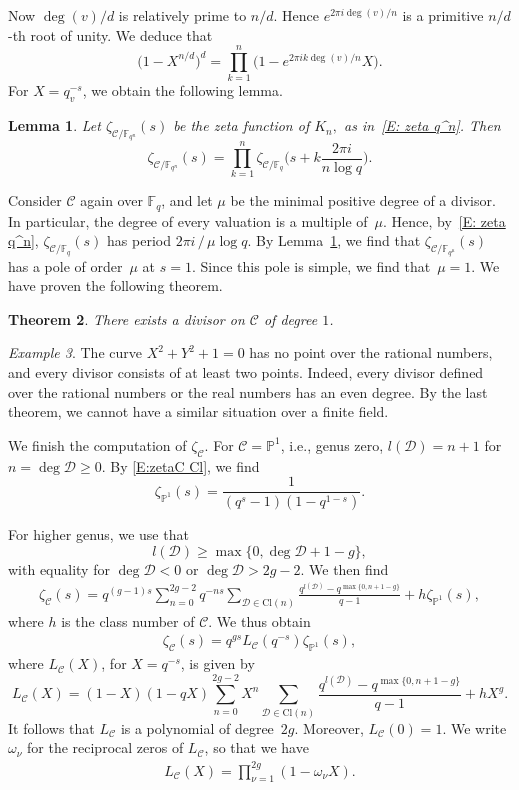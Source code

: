 \documentclass{amsart}
\renewcommand\P{\mathbb{P}}
\newcommand\F{\mathbb{F}}
\newcommand\Curve{\mathcal{C}}
\newcommand\calD{\mathcal{D}}	\newcommand\calK{\mathcal{K}}
\newcommand\Pic{\mathrm{Cl}}
\newtheorem{theorem}{Theorem}[section]
\newtheorem{lemma}[theorem]{Lemma}
\theoremstyle{definition}\newtheorem{definition}[theorem]{Definition}
\theoremstyle{remark}\newtheorem{remark}[theorem]{Remark}
\newtheorem{example}[theorem]{Example}\newtheorem{exercise}[theorem]{Exercise}
\numberwithin{equation}{section}
\begin{document}
Now $\deg(v)/d$ is relatively prime to $n/d$.
Hence $e^{2\pi i\deg(v)/n}$ is a primitive $n/d$-th root of unity.
We deduce that
$$
\bigl(1-X^{n/d}\bigr)^d=\prod_{k=1}^n\bigl(1-e^{2\pi ik\deg (v)/n}X\bigr).
$$
For $X=q_v^{-s}$,
we obtain the following lemma.

\begin{lemma}\label{L: zeta q^n}
Let\/ $\zeta_{\Curve/\F_{q^n}}(s)$ be the zeta function of\/ $K_n,$
as in~\eqref{E: zeta q^n}.
Then
$$
\zeta_{\Curve/\F_{q^n}}(s)=\prod_{k=1}^n\zeta_{\Curve/\F_q}\biggl(s+k\frac{2\pi i}{n\log q}\biggr).
$$
\end{lemma}

Consider $\Curve$ again over $\F_q$,
and let $\mu$ be the minimal positive degree of a divisor.
In particular,
the degree of every valuation is a multiple of~$\mu$.
Hence,
by~\eqref{E: zeta q^n},
$\zeta_{\Curve/\F_q}(s)$ has period $2\pi i\,/\,\mu\log q$.
By Lemma~\ref{L: zeta q^n},
we find that $\zeta_{\Curve/\F_{q^\mu}}(s)$ has a pole of order~$\mu$ at $s=1$.
Since this pole is simple,
we find that~\mbox{$\mu=1$}.
We have proven the following theorem.

\begin{theorem}\label{T: degree one}
There exists a divisor on\/ $\Curve$ of degree $1$.
\end{theorem}

\begin{example}
The curve $X^2+Y^2+1=0$ has no point over the rational numbers,
and every divisor consists of at least two points.
Indeed,
every divisor defined over the rational numbers or the real numbers has an even degree.
By the last theorem,
we cannot have a similar situation over a finite field.
\end{example}

We finish the computation of $\zeta_\Curve$.
For $\Curve=\P^1$,
i.e.,
genus zero,
$l(\calD)=n+1$ for $n=\deg\calD\geq0$.
By \eqref{E:zetaC Cl},
we find
$$
\zeta_{\P^1}(s)=\frac1{(q^s-1)(1-q^{1-s})}.
$$

For higher genus,
we use that
$$
l(\calD)\geq\max\{0,\deg\calD+1-g\},
$$
with equality for $\deg\calD<0$ or $\deg\calD>2g-2$.
We then find
\begin{gather}\label{E: zeta_C}
\zeta_\Curve(s)
=q^{(g-1)s}\sum_{n=0}^{2g-2}q^{-ns}\sum_{\calD\in\Pic(n)}\frac{q^{l(\calD)}-q^{\max\{0,n+1-g\}}}{q-1}+h\zeta_{\P^1}(s),
\end{gather}
where $h$ is the class number of $\Curve$.
We thus obtain
\begin{gather}\label{E: zetaC L}
\zeta_\Curve(s)=q^{gs}L_\Curve(q^{-s})\zeta_{\P^1}(s),
\end{gather}
where $L_\Curve(X)$,
for $X=q^{-s}$,
is given by
$$
L_\Curve(X)=(1-X)(1-qX)\sum_{n=0}^{2g-2}X^{n}\sum_{\calD\in\Pic(n)}\frac{q^{l(\calD)}-q^{\max\{0,n+1-g\}}}{q-1}+hX^g.
$$
It follows that $L_\Curve$ is a polynomial of degree~$2g$.
Moreover,
$L_\Curve(0)=1$.
We write $\omega_\nu$ for the reciprocal zeros of $L_\Curve$,
so that
we have
\begin{gather}\label{E:L=omega}
L_\Curve(X)=\prod_{\nu=1}^{2g}(1-\omega_\nu X).
\end{gather}
\end{document}
